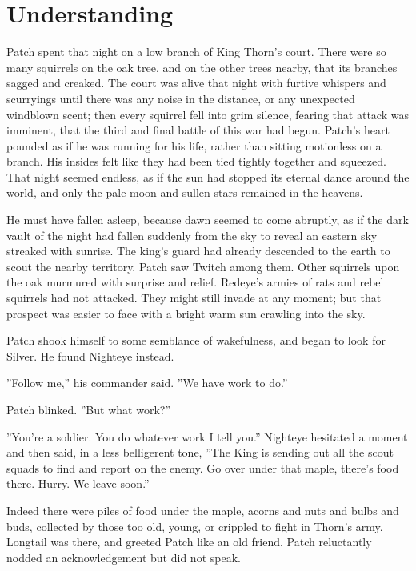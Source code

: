 \documentclass[12pt]{book}
\begin{document}

\section{Understanding}

Patch spent that night on a low branch of King Thorn's court. There were so many squirrels on the oak tree, and on the other trees nearby, that its branches sagged and creaked. The court was alive that night with furtive whispers and scurryings %
until there was any noise in the distance, or any unexpected windblown scent; then every squirrel fell into grim silence, fearing that attack was imminent, that the third and final battle of this war had begun. Patch's heart pounded as if he was running for his life, rather than sitting motionless on a branch. His insides felt like they had been tied tightly together and squeezed. That night seemed endless, as if the sun had stopped its eternal dance around the world, and only the pale moon and sullen stars remained in the heavens.

He must have fallen asleep, because dawn seemed to come abruptly, as if the dark vault of the night had fallen suddenly from the sky to reveal an eastern sky streaked with sunrise. The king's guard had already descended to the earth to scout the nearby territory. Patch saw Twitch among them. Other squirrels upon the oak murmured with surprise and relief. Redeye's armies of rats and rebel squirrels had not attacked. They might still invade at any moment; but that prospect was easier to face with a bright warm sun crawling into the sky.

Patch shook himself to some semblance of wakefulness, and began to look for Silver. He found Nighteye instead.

''Follow me,'' his commander said. ''We have work to do.''

Patch blinked. ''But %
what work?''

''You're a soldier. You do whatever work I tell you.'' Nighteye hesitated a moment and then said, in a less belligerent tone, ''The King is sending out all the scout squads to find and report on the enemy. Go over under that maple, there's food there. Hurry. We leave soon.''

Indeed there were piles of food under the maple, acorns and nuts and bulbs and buds, collected by those too old, young, or crippled to fight in Thorn's army. Longtail was there, and greeted Patch like an old friend. Patch reluctantly nodded an acknowledgement but did not speak.
\end{document}
